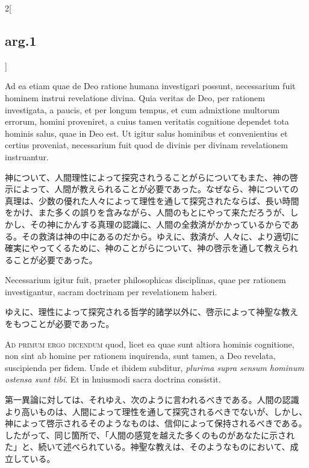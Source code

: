 \documentclass[
paper=a4paper,
fontsize=10pt,
jafontsize=9pt,
titlepage
]{jlreq}
\begin{document}
\begin{paracol}{2}[\subsection{arg.1}]
\switchcolumn*

Ad ea etiam quae de Deo ratione humana investigari possunt,
necessarium fuit hominem instrui revelatione divina. Quia veritas de
Deo, per rationem investigata, a paucis, et per longum tempus, et cum
admixtione multorum errorum, homini proveniret, a cuius tamen
veritatis cognitione dependet tota hominis salus, quae in Deo est. Ut
igitur salus hominibus et convenientius et certius proveniat,
necessarium fuit quod de divinis per divinam revelationem instruantur.

\switchcolumn

神について、人間理性によって探究されうることがらについてもまた、神の啓
示によって、人間が教えられることが必要であった。なぜなら、神についての
真理は、少数の優れた人々によって理性を通して探究されたならば、長い時間
をかけ、また多くの誤りを含みながら、人間のもとにやって来ただろうが、し
かし、その神にかんする真理の認識に、人間の全救済がかかっているからであ
る。その救済は神の中にあるのだから。ゆえに、救済が、人々に、より適切に
確実にやってくるために、神のことがらについて、神の啓示を通して教えられ
ることが必要であった。

\switchcolumn*

Necessarium igitur fuit, praeter philosophicas disciplinas,
quae per rationem investigantur, sacram doctrinam per revelationem
haberi.

\switchcolumn

ゆえに、理性によって探究される哲学的諸学以外に、啓示によって神聖な教え
をもつことが必要であった。

\switchcolumn*[\subsection{ad.1}]

{\scshape Ad primum ergo dicendum} quod, licet ea quae sunt altiora
hominis cognitione, non sint ab homine per rationem inquirenda, sunt
tamen, a Deo revelata, suscipienda per fidem. Unde et ibidem subditur,
{\itshape plurima supra sensum hominum ostensa sunt tibi}. Et in
huiusmodi sacra doctrina consistit.

\switchcolumn

第一異論に対しては、それゆえ、次のように言われるべきである。人間の認識
より高いものは、人間によって理性を通して探究されるべきでないが、しかし、
神によって啓示されるそのようなものは、信仰によって保持されるべきである。
したがって、同じ箇所で、「人間の感覚を越えた多くのものがあなたに示され
た」と、続いて述べられている。神聖な教えは、そのようなものにおいて、成
立している。


\end{paracol}
\end{document}
